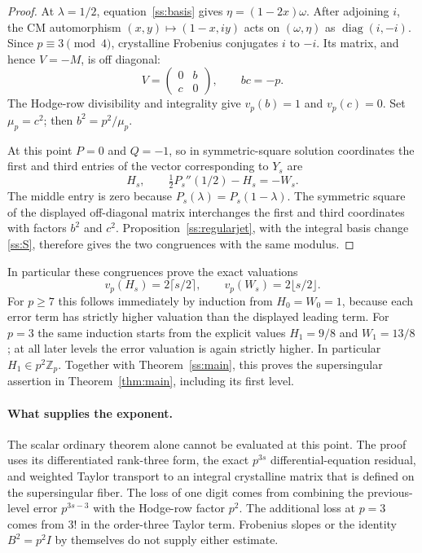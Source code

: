 \documentclass[11pt,a4paper]{article}
\begin{document}
\begin{proof}
At $\lambda=1/2$, equation~\eqref{ss:basis} gives
$\eta=(1-2x)\omega$.  After adjoining $i$, the CM automorphism
$(x,y)\mapsto(1-x,iy)$ acts on $(\omega,\eta)$ as
$\operatorname{diag}(i,-i)$.  Since $p\equiv3\pmod4$, crystalline
Frobenius conjugates $i$ to $-i$.  Its matrix, and hence $V=-M$, is
off diagonal:
\[
 V=\begin{pmatrix}0&b\\c&0\end{pmatrix},\qquad bc=-p.
\]
The Hodge-row divisibility and integrality give $v_p(b)=1$ and
$v_p(c)=0$.  Set $\mu_p=c^2$; then $b^2=p^2/\mu_p$.

At this point $P=0$ and $Q=-1$, so in symmetric-square solution
coordinates the first and third entries of the vector corresponding
to $Y_s$ are
\[
 H_s,\qquad \tfrac12P_s''(1/2)-H_s=-W_s.
\]
The middle entry is zero because $P_s(\lambda)=P_s(1-\lambda)$.
The symmetric square of the displayed off-diagonal matrix interchanges
the first and third coordinates with factors $b^2$ and $c^2$.
Proposition~\ref{ss:regularjet}, with the integral basis change
\eqref{ss:S}, therefore gives the two congruences with the same modulus.
\end{proof}

In particular these congruences prove the exact valuations
\[
 v_p(H_s)=2\lceil s/2\rceil,\qquad
 v_p(W_s)=2\lfloor s/2\rfloor.
\]
For $p\geq7$ this follows immediately by induction from
$H_0=W_0=1$, because each error term has strictly higher valuation
than the displayed leading term.  For $p=3$ the same induction starts
from the explicit values $H_1=9/8$ and $W_1=13/8$; at all later levels
the error valuation is again strictly higher.
In particular $H_1\in p^2\mathbb Z_p$. Together with
Theorem~\ref{ss:main}, this proves the supersingular assertion
in Theorem~\ref{thm:main}, including its first level.

\paragraph{What supplies the exponent.}
The scalar ordinary theorem alone cannot be evaluated at this point.
The proof uses its differentiated rank-three form, the exact
$p^{3s}$ differential-equation residual, and weighted Taylor transport
to an integral crystalline matrix that is defined on the supersingular
fiber.  The loss of one digit comes from combining the previous-level
error $p^{3s-3}$ with the Hodge-row factor $p^2$.  The additional loss at
$p=3$ comes from $3!$ in the order-three Taylor term.  Frobenius slopes
or the identity $B^2=p^2I$ by themselves do not supply either estimate.
\end{document}
